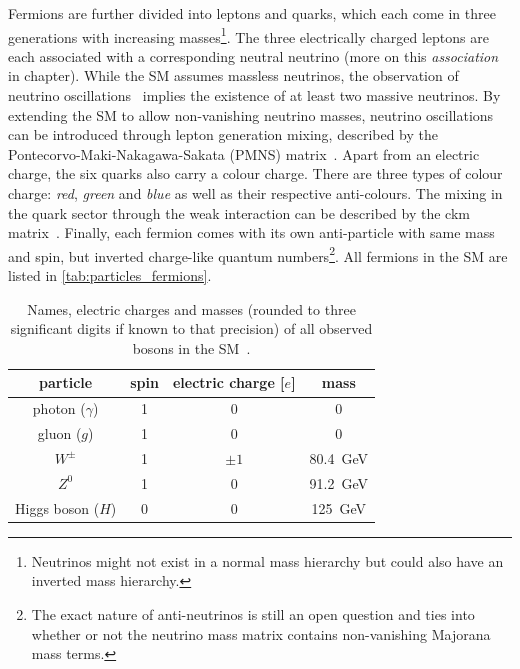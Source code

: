 
Fermions are further divided into leptons and quarks, which each come in three generations with increasing masses\footnote{Neutrinos might not exist in a normal mass hierarchy but could also have an inverted mass hierarchy.}. The three electrically charged leptons are each associated with a corresponding neutral neutrino (more on this \textit{association} in chapter). While the SM assumes massless neutrinos, the observation of neutrino oscillations~\cite{Fukuda:1998mi} implies the existence of at least two massive neutrinos. By extending the SM to allow non-vanishing neutrino masses, neutrino oscillations can be introduced through lepton generation mixing, described by the Pontecorvo-Maki-Nakagawa-Sakata (PMNS) matrix~\cite{PMNS:1962mu}. Apart from an electric charge, the six quarks also carry a colour charge. There are three types of colour charge: \textit{red}, \textit{green} and \textit{blue} as well as their respective anti-colours. The mixing in the quark sector through the weak interaction can be described by the \gls{ckm} matrix~\cite{PhysRevLett.10.531,CKM:1973fv}. Finally, each fermion comes with its own anti-particle with same mass and spin, but inverted charge-like quantum numbers\footnote{The exact nature of anti-neutrinos is still an open question and ties into whether or not the neutrino mass matrix contains non-vanishing Majorana mass terms.}. All fermions in the SM are listed in \cref{tab:particles_fermions}.


\begin{table}
	\centering
	\setlength\heavyrulewidth{0.2ex}
	\small
	\caption{Names, electric charges and masses (rounded to three significant digits if known to that precision) of all observed bosons in the SM~\cite{pdg2020}.}
	\begin{tabular} {c c c c}
	\toprule
		particle & spin & electric charge [$e$]& mass \\ 
	\midrule
		photon ($\gamma$) & 1 & 0 & 0\\
		gluon ($g$) & 1 & 0 & 0 \\
		$W^\pm$ & 1 & $\pm 1$ & \SI{80.4}{\GeV} \\
		$Z^0$ & 1 & 0 & \SI{91.2}{\GeV} \\
		Higgs boson ($H$) & 0 & 0 & \SI{125}{\GeV} \\
	\bottomrule					
	\end{tabular}\vspace{3mm}
	\label{tab:particles_bosons}   
\end{table}


